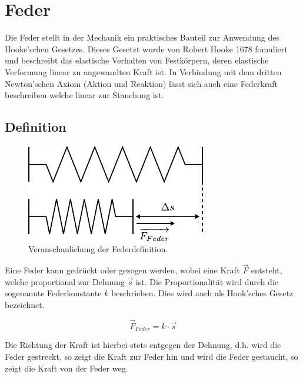 \chapter{Feder}

Die Feder stellt in der Mechanik ein praktisches Bauteil zur Anwendung
des Hooke'schen Gesetzes. Dieses Gesetzt wurde von Robert Hooke 1678 
fomuliert und beschreibt das elastische Verhalten von Festkörpern,
deren elastische Verformung linear zu angewandten Kraft ist. 
In Verbindung mit dem dritten Newton'schen Axiom (Aktion und Reaktion) 
lässt sich auch eine Federkraft beschreiben welche linear zur Stauchung
ist.

\newpage
\section{Definition}

\begin{figure}[h!]
	\centering
	\includegraphics[scale=0.75]{feder-dehnung.pdf}
	\caption{Veranschaulichung der Federdefinition.}
	\label{fig:feder-dehnung}
\end{figure}

\noindent
Eine Feder kann gedrückt oder gezogen werden, wobei eine Kraft $\vec{F}$ 
entsteht, welche proportional zur Dehnung $\vec{s}$ ist. 
Die Proportionalität wird durch die sogenannte Federkonstante $k$ 
beschrieben. Dies wird auch als Hook'sches Gesetz bezeichnet.

\[ \boxed{\vec{F}_{Feder} = k \cdot \vec{s}} \]

\noindent
Die Richtung der Kraft ist hierbei stets entgegen der Dehnung, d.h. wird die
Feder gestreckt, so zeigt die Kraft zur Feder hin und wird die Feder
gestaucht, so zeigt die Kraft von der Feder weg.

